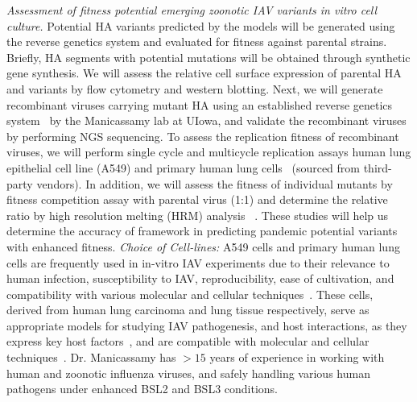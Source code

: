 \documentclass[onecolumn, compsoc,12pt]{IEEEtran}
\def\SUPPLEMENTARY{Supplementary\xspace}
\begin{document}
\textit{Assessment of fitness potential emerging zoonotic IAV variants in vitro cell culture.} Potential HA variants predicted by the \enet models will be generated using the reverse genetics system and evaluated for fitness against parental strains. Briefly, HA segments with potential mutations will be obtained through synthetic gene synthesis. We will assess the relative cell surface expression of parental HA and variants by flow cytometry and western
blotting. Next, we will generate recombinant viruses carrying mutant HA using an established reverse genetics system~\cite{pmid35926068,pmid34473799,pmid33970958,pmid32075925,pmid29899269,pmid28282445,pmid23686828,pmid20534532,pmid20126449} by the Manicassamy lab at UIowa, and validate the recombinant viruses by performing NGS sequencing. To assess the replication fitness of recombinant viruses, we will perform single cycle and multicycle replication assays human lung epithelial cell line (A549) and primary human lung cells~\cite{pmid23720581} (sourced from third-party vendors). In addition, we will assess the fitness of individual mutants by fitness competition assay with parental virus (1:1) and determine the relative ratio
by high resolution melting (HRM) analysis~\cite{ganti2021rab11a,wittwer2003high,marshall2013influenza} . These studies will help us determine the accuracy of \enet framework in predicting pandemic potential variants with enhanced fitness.  \textit{Choice of Cell-lines:} A549 cells and primary human lung cells are frequently used in in-vitro IAV experiments  due to their relevance to human infection, susceptibility to IAV, reproducibility, ease of cultivation, and compatibility with various molecular and cellular techniques~\cite{matrosovich1997avian}. These cells, derived from human lung carcinoma and lung tissue respectively, serve as appropriate models for studying IAV  pathogenesis, and host interactions, as they express key host factors~\cite{shinya2006influenza,chan2010tropism}, and are compatible with molecular and cellular techniques~\cite{neumann1999generation}. Dr. Manicassamy has $>15$ years of experience in working with human and zoonotic influenza viruses, and safely handling various human pathogens under enhanced BSL2 and BSL3 conditions.


\end{document}
